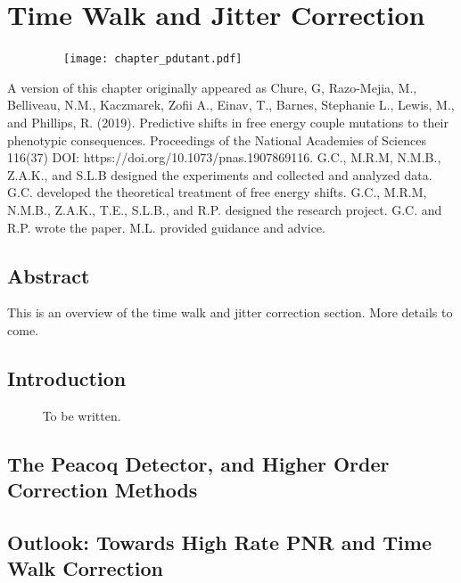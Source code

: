 \documentclass[12pt]{caltech_thesis}
\begin{document}
\hypertarget{time-walk-and-jitter-correction}{%
\chapter{Time Walk and Jitter
Correction}\label{time-walk-and-jitter-correction}}

~~~~~~~~~\texttt{[image: chapter\_pdutant.pdf]}

A version of this chapter originally appeared as Chure, G, Razo-Mejia,
M., Belliveau, N.M., Kaczmarek, Zofii A., Einav, T., Barnes, Stephanie
L., Lewis, M., and Phillips, R. (2019). Predictive shifts in free energy
couple mutations to their phenotypic consequences. Proceedings of the
National Academies of Sciences 116(37) DOI:
https://doi.org/10.1073/pnas.1907869116. G.C., M.R.M, N.M.B., Z.A.K.,
and S.L.B designed the experiments and collected and analyzed data. G.C.
developed the theoretical treatment of free energy shifts. G.C., M.R.M,
N.M.B., Z.A.K., T.E., S.L.B., and R.P. designed the research project.
G.C. and R.P. wrote the paper. M.L. provided guidance and advice.

\hypertarget{abstract-2}{%
\section{Abstract}\label{abstract-2}}

This is an overview of the time walk and jitter correction section. More
details to come.

\hypertarget{introduction-2}{%
\section{Introduction}\label{introduction-2}}

~~~~~ To be written.

\hypertarget{the-peacoq-detector-and-higher-order-correction-methods}{%
\section{The Peacoq Detector, and Higher Order Correction
Methods}\label{the-peacoq-detector-and-higher-order-correction-methods}}

\hypertarget{outlook-towards-high-rate-pnr-and-time-walk-correction}{%
\section{Outlook: Towards High Rate PNR and Time Walk
Correction}\label{outlook-towards-high-rate-pnr-and-time-walk-correction}}
\end{document}
